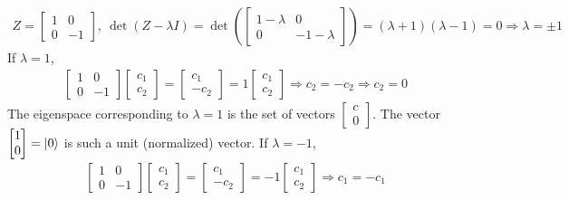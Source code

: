 \begin{align*}
	Z = \begin{bmatrix}
	1 & 0 \\
	0 & -1
	\end{bmatrix},\ \det(Z-\lambda I) =
	\det \left(\begin{bmatrix}
	1-\lambda & 0 \\
	0 & -1-\lambda
	\end{bmatrix} \right) = (\lambda+1)(\lambda- 1) = 0 \Rightarrow \lambda = \pm 1
\end{align*}
If $\lambda = 1$,
\begin{align*}
	\begin{bmatrix}
		1 & 0 \\
		0 & -1
	\end{bmatrix}
	\begin{bmatrix}
		c_1 \\
		c_2
	\end{bmatrix} =
	\begin{bmatrix}
	      c_1 \\
	      -c_2
	\end{bmatrix} =
	 1
	\begin{bmatrix}
		c_1 \\
		c_2
	\end{bmatrix}
	\Rightarrow c_2 = -c_2 \Rightarrow c_2 = 0
\end{align*}
The eigenspace corresponding to $\lambda = 1$ is the set of vectors $\begin{bmatrix}c \\ 0\end{bmatrix}$.  The vector $\begin{bmatrix} 1 \\ 0\end{bmatrix}=\ket{0}$ is such a unit (normalized) vector. 
If $\lambda = -1$,
\begin{align*}
	\begin{bmatrix}
		1 & 0 \\
		0 & -1
	\end{bmatrix}
	\begin{bmatrix}
		c_1 \\
		c_2
	\end{bmatrix} =
	\begin{bmatrix}
	      c_1 \\
	      -c_2
	\end{bmatrix} =
	 -1
	\begin{bmatrix}
		c_1 \\
		c_2
	\end{bmatrix}
	\Rightarrow c_1 = -c_1
\end{align*}
